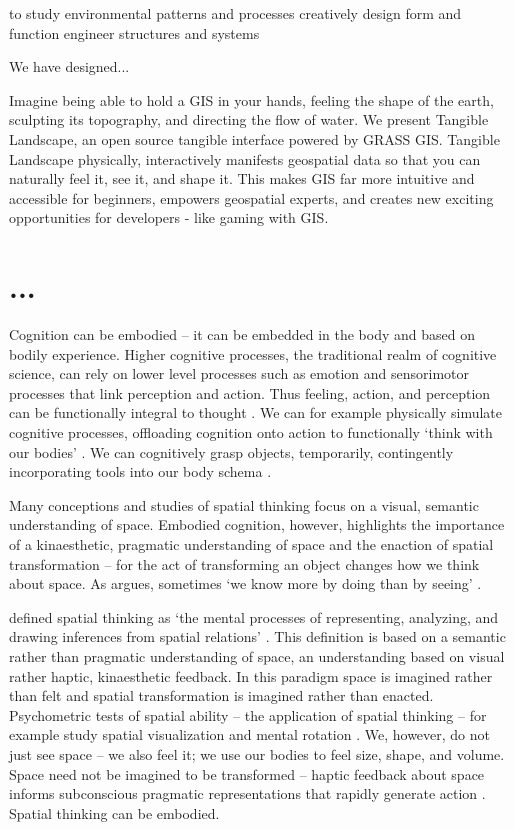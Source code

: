 to
study environmental patterns and processes
creatively design form and function
engineer structures and systems






We have designed...

Imagine being able to hold a GIS in your hands, feeling the shape of the earth, sculpting its topography, and directing the flow of water. We present Tangible Landscape, an open source tangible interface powered by GRASS GIS. Tangible Landscape physically, interactively manifests geospatial data so that you can naturally feel it, see it, and shape it. This makes GIS far more intuitive and accessible for beginners, empowers geospatial experts, and creates new exciting opportunities for developers - like gaming with GIS. 


\section{...}



Cognition can be embodied -- it can be embedded in the body and based on bodily experience. 
Higher cognitive processes, the traditional realm of cognitive science, 
can rely on lower level processes such as emotion and sensorimotor processes that link perception and action. 
Thus feeling, action, and perception can be functionally integral to thought \cite{Hardy-Vallee2008}. 
We can for example physically simulate cognitive processes, offloading cognition onto action to functionally `think with our bodies' \cite{Kirsh2013}. 
We can cognitively grasp objects, temporarily, contingently incorporating tools into our body schema \cite{Kirsh2013}.


Many conceptions and studies of spatial thinking focus on a visual, semantic understanding of space. 
Embodied cognition, however, highlights the importance of a kinaesthetic, pragmatic understanding of space
and the enaction of spatial transformation -- for the act of transforming an object changes how we think about space. 
As \cite{Kirsh2013} argues, sometimes `we know more by doing than by seeing' \cite{Kirsh2013}.


\cite{Uttal2013} defined spatial thinking as 
`the mental processes of representing, analyzing, and drawing inferences from spatial relations' \cite{Uttal2013}. 
This definition is based on a semantic rather than pragmatic understanding of space, an understanding based on visual rather haptic, kinaesthetic feedback. 
In this paradigm space is imagined rather than felt and spatial transformation is imagined rather than enacted. 
Psychometric tests of spatial ability -- the application of spatial thinking -- for example study spatial visualization and mental rotation \cite{Uttal2013,Uttal2013a,Ormand2014}.
We, however, do not just see space -- we also feel it; we use our bodies to feel size, shape, and volume. 
Space need not be imagined to be transformed -- haptic feedback about space informs subconscious pragmatic representations that rapidly generate action \cite{Jeannerod1997}. Spatial thinking can be embodied.

